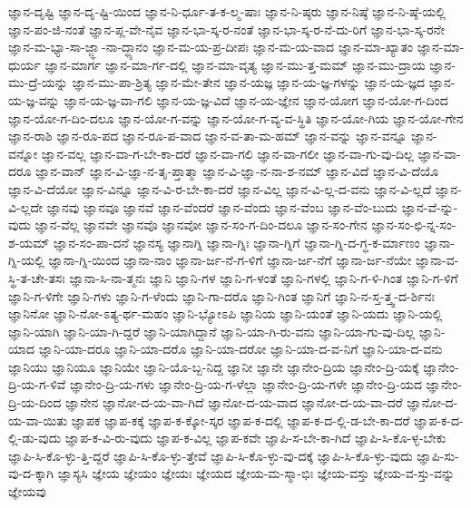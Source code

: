 {ಜ್ಞಾನ-ದೃಷ್ಟಿ
ಜ್ಞಾನ-ದೃ-ಷ್ಟಿ-ಯಿಂದ
ಜ್ಞಾನ-ನಿ-ರ್ಧೂ-ತ-ಕ-ಲ್ಮ-ಷಾಃ
ಜ್ಞಾನ-ನಿ-ಷ್ಠರು
ಜ್ಞಾನ-ನಿಷ್ಠೆ
ಜ್ಞಾನ-ನಿ-ಷ್ಠೆ-ಯಲ್ಲಿ
ಜ್ಞಾನ-ಪಂ-ಜಿ-ನಂತೆ
ಜ್ಞಾನ-ಪ್ಲ-ವೇ-ನೈವ
ಜ್ಞಾನ-ಭಾ-ಸ್ಕ-ರ-ನಂತೆ
ಜ್ಞಾನ-ಭಾ-ಸ್ಕ-ರ-ನೆ-ದು-ರಿಗೆ
ಜ್ಞಾನ-ಭಾ-ಸ್ಕ-ರನೇ
ಜ್ಞಾನ-ಮ-ಭ್ಯಾ-ಸಾ-ಜ್ಜ್ಞಾ-ನಾ-ದ್ಧ್ಯಾನಂ
ಜ್ಞಾನ-ಮ-ಯ-ಪ್ರ-ದೀಪಃ
ಜ್ಞಾನ-ಮ-ಯ-ವಾದ
ಜ್ಞಾನ-ಮಾ-ಖ್ಯಾತಂ
ಜ್ಞಾನ-ಮಾ-ಧುರ್ಯ
ಜ್ಞಾನ-ಮಾರ್ಗ
ಜ್ಞಾನ-ಮಾ-ರ್ಗ-ದಲ್ಲಿ
ಜ್ಞಾನ-ಮಾ-ವೃತ್ಯ
ಜ್ಞಾನ-ಮು-ತ್ತ-ಮಮ್
ಜ್ಞಾನ-ಮು-ದ್ರಾಯ
ಜ್ಞಾನ-ಮು-ದ್ರೆ-ಯನ್ನು
ಜ್ಞಾನ-ಮು-ಪಾ-ಶ್ರಿತ್ಯ
ಜ್ಞಾನ-ಮೇ-ತೇನ
ಜ್ಞಾನ-ಯಜ್ಞ
ಜ್ಞಾನ-ಯ-ಜ್ಞ-ಗಳನ್ನು
ಜ್ಞಾನ-ಯ-ಜ್ಞದ
ಜ್ಞಾನ-ಯ-ಜ್ಞ-ವನ್ನು
ಜ್ಞಾನ-ಯ-ಜ್ಞ-ವಾ-ಗಲಿ
ಜ್ಞಾನ-ಯ-ಜ್ಞ-ವಿದೆ
ಜ್ಞಾನ-ಯ-ಜ್ಞೇನ
ಜ್ಞಾನ-ಯೋಗ
ಜ್ಞಾನ-ಯೋ-ಗ-ದಿಂದ
ಜ್ಞಾನ-ಯೋ-ಗ-ದಿಂ-ದಲೂ
ಜ್ಞಾನ-ಯೋ-ಗ-ವನ್ನು
ಜ್ಞಾನ-ಯೋ-ಗ-ವ್ಯ-ವ-ಸ್ಥಿತಿ
ಜ್ಞಾನ-ಯೋ-ಗಿಯ
ಜ್ಞಾನ-ಯೋ-ಗೇನ
ಜ್ಞಾನ-ರಾಶಿ
ಜ್ಞಾನ-ರೂ-ಪದ
ಜ್ಞಾನ-ರೂ-ಪ-ವಾದ
ಜ್ಞಾನ-ವ-ತಾ-ಮ-ಹಮ್
ಜ್ಞಾನ-ವನ್ನು
ಜ್ಞಾನ-ವನ್ನೂ
ಜ್ಞಾನ-ವನ್ನೋ
ಜ್ಞಾನ-ವಲ್ಲ
ಜ್ಞಾನ-ವಾ-ಗ-ಬೇ-ಕಾ-ದರೆ
ಜ್ಞಾನ-ವಾ-ಗಲಿ
ಜ್ಞಾನ-ವಾ-ಗಲೀ
ಜ್ಞಾನ-ವಾ-ಗು-ವು-ದಿಲ್ಲ
ಜ್ಞಾನ-ವಾ-ದರೂ
ಜ್ಞಾನ-ವಾನ್
ಜ್ಞಾನ-ವಿ-ಜ್ಞಾ-ನ-ತೃ-ಪ್ತಾತ್ಮಾ
ಜ್ಞಾನ-ವಿ-ಜ್ಞಾ-ನ-ನಾ-ಶ-ನಮ್
ಜ್ಞಾನ-ವಿದೆ
ಜ್ಞಾನ-ವಿ-ದೆಯೊ
ಜ್ಞಾನ-ವಿ-ದೆಯೋ
ಜ್ಞಾನ-ವಿನ್ನೂ
ಜ್ಞಾನ-ವಿ-ರ-ಬೇ-ಕಾ-ದರೆ
ಜ್ಞಾನ-ವಿಲ್ಲ
ಜ್ಞಾನ-ವಿ-ಲ್ಲ-ದ-ವನು
ಜ್ಞಾನ-ವಿ-ಲ್ಲದೆ
ಜ್ಞಾನ-ವಿ-ಲ್ಲದೇ
ಜ್ಞಾನವು
ಜ್ಞಾನವೂ
ಜ್ಞಾನವೆ
ಜ್ಞಾನ-ವೆಂದರೆ
ಜ್ಞಾನ-ವೆಂದು
ಜ್ಞಾನ-ವೆಂಬ
ಜ್ಞಾನ-ವೆಂ-ಬುದು
ಜ್ಞಾನ-ವೆ-ನ್ನು-ವುದು
ಜ್ಞಾನ-ವೆಲ್ಲ
ಜ್ಞಾನವೇ
ಜ್ಞಾನವೊ
ಜ್ಞಾನವೋ
ಜ್ಞಾನ-ಸಂ-ಗ-ದಿಂ-ದಲೂ
ಜ್ಞಾನ-ಸಂ-ಗೇನ
ಜ್ಞಾನ-ಸಂ-ಛಿ-ನ್ನ-ಸಂ-ಶ-ಯಮ್
ಜ್ಞಾನ-ಸಂ-ಪಾ-ದನೆ
ಜ್ಞಾನಸ್ಯ
ಜ್ಞಾನಾಗ್ನಿ
ಜ್ಞಾನಾ-ಗ್ನಿಃ
ಜ್ಞಾನಾ-ಗ್ನಿಗೆ
ಜ್ಞಾನಾ-ಗ್ನಿ-ದ-ಗ್ಧ-ಕ-ರ್ಮಾಣಂ
ಜ್ಞಾನಾ-ಗ್ನಿ-ಯಲ್ಲಿ
ಜ್ಞಾನಾ-ಗ್ನಿ-ಯಿಂದ
ಜ್ಞಾನಾ-ನಾಂ
ಜ್ಞಾನಾ-ರ್ಜ-ನೆ-ಗ-ಳಿಗೆ
ಜ್ಞಾನಾ-ರ್ಜ-ನೆಗೆ
ಜ್ಞಾನಾ-ರ್ಜ-ನೆಯೇ
ಜ್ಞಾನಾ-ವ-ಸ್ಥಿ-ತ-ಚೇ-ತಸಃ
ಜ್ಞಾನಾ-ಸಿ-ನಾ-ತ್ಮನಃ
ಜ್ಞಾನಿ
ಜ್ಞಾನಿ-ಗಳ
ಜ್ಞಾನಿ-ಗ-ಳಂತೆ
ಜ್ಞಾನಿ-ಗಳಲ್ಲಿ
ಜ್ಞಾನಿ-ಗ-ಳಿ-ಗಿಂತ
ಜ್ಞಾನಿ-ಗ-ಳಿಗೆ
ಜ್ಞಾನಿ-ಗ-ಳಿಗೇ
ಜ್ಞಾನಿ-ಗಳು
ಜ್ಞಾನಿ-ಗ-ಳೆಂದು
ಜ್ಞಾನಿ-ಗಾ-ದರೊ
ಜ್ಞಾನಿ-ಗಿಂತ
ಜ್ಞಾನಿಗೆ
ಜ್ಞಾನಿ-ನ-ಸ್ತ-ತ್ತ್ವ-ದ-ರ್ಶಿನಃ
ಜ್ಞಾನಿನೋ
ಜ್ಞಾನಿ-ನೋ-ಽತ್ಯ-ರ್ಥ-ಮಹಂ
ಜ್ಞಾನಿ-ಭ್ಯೋಽಪಿ
ಜ್ಞಾನಿಯ
ಜ್ಞಾನಿ-ಯಂತೆ
ಜ್ಞಾನಿ-ಯದು
ಜ್ಞಾನಿ-ಯಲ್ಲಿ
ಜ್ಞಾನಿ-ಯಾಗಿ
ಜ್ಞಾನಿ-ಯಾ-ಗಿ-ದ್ದರೆ
ಜ್ಞಾನಿ-ಯಾಗಿದ್ದಾನೆ
ಜ್ಞಾನಿ-ಯಾ-ಗಿ-ರು-ವನು
ಜ್ಞಾನಿ-ಯಾ-ಗು-ವು-ದಿಲ್ಲ
ಜ್ಞಾನಿ-ಯಾದ
ಜ್ಞಾನಿ-ಯಾ-ದರೂ
ಜ್ಞಾನಿ-ಯಾ-ದರೊ
ಜ್ಞಾನಿ-ಯಾ-ದರೋ
ಜ್ಞಾನಿ-ಯಾ-ದ-ವ-ನಿಗೆ
ಜ್ಞಾನಿ-ಯಾ-ದ-ವನು
ಜ್ಞಾನಿಯು
ಜ್ಞಾನಿಯೂ
ಜ್ಞಾನಿಯೇ
ಜ್ಞಾನಿ-ಯೊ-ಬ್ಬ-ನಿದ್ದ
ಜ್ಞಾನೀ
ಜ್ಞಾನೇ
ಜ್ಞಾನೇಂ-ದ್ರಿಯ
ಜ್ಞಾನೇಂ-ದ್ರಿ-ಯಕ್ಕೆ
ಜ್ಞಾನೇಂ-ದ್ರಿ-ಯ-ಗ-ಳಿವೆ
ಜ್ಞಾನೇಂ-ದ್ರಿ-ಯ-ಗಳು
ಜ್ಞಾನೇಂ-ದ್ರಿ-ಯ-ಗ-ಳೆಲ್ಲಾ
ಜ್ಞಾನೇಂ-ದ್ರಿ-ಯ-ಗಳೇ
ಜ್ಞಾನೇಂ-ದ್ರಿ-ಯದ
ಜ್ಞಾನೇಂ-ದ್ರಿ-ಯ-ದಿಂದ
ಜ್ಞಾನೇನ
ಜ್ಞಾನೋ-ದ-ಯ-ವಾ-ಗಿದೆ
ಜ್ಞಾನೋ-ದ-ಯ-ವಾದ
ಜ್ಞಾನೋ-ದ-ಯ-ವಾ-ದರೆ
ಜ್ಞಾನೋ-ದ-ಯ-ವಾ-ಯಿತು
ಜ್ಞಾಪಕ
ಜ್ಞಾಪ-ಕಕ್ಕೆ
ಜ್ಞಾಪ-ಕ-ಕ್ಕೋ-ಸ್ಕರ
ಜ್ಞಾಪ-ಕ-ದಲ್ಲಿ
ಜ್ಞಾಪ-ಕ-ದ-ಲ್ಲಿ-ಡ-ಬೇ-ಕಾ-ದರೆ
ಜ್ಞಾಪ-ಕ-ದ-ಲ್ಲಿ-ಡು-ವುದು
ಜ್ಞಾಪ-ಕ-ವಿ-ರು-ವುದು
ಜ್ಞಾಪ-ಕ-ವಿಲ್ಲ
ಜ್ಞಾಪ-ಕವೇ
ಜ್ಞಾಪಿ-ಸ-ಬೇ-ಕಾ-ಗಿದೆ
ಜ್ಞಾಪಿ-ಸಿ-ಕೊ-ಳ್ಳ-ಬೇಕು
ಜ್ಞಾಪಿ-ಸಿ-ಕೊ-ಳ್ಳು-ತ್ತಿ-ದ್ದರೆ
ಜ್ಞಾಪಿ-ಸಿ-ಕೊ-ಳ್ಳು-ತ್ತೇವೆ
ಜ್ಞಾಪಿ-ಸಿ-ಕೊ-ಳ್ಳು-ವು-ದಕ್ಕೆ
ಜ್ಞಾಪಿ-ಸಿ-ಕೊ-ಳ್ಳು-ವುದು
ಜ್ಞಾಪಿ-ಸು-ವು-ದ-ಕ್ಕಾಗಿ
ಜ್ಞಾಸ್ಯಸಿ
ಜ್ಞೇಯ
ಜ್ಞೇಯಂ
ಜ್ಞೇಯಃ
ಜ್ಞೇಯದ
ಜ್ಞೇಯ-ಮ-ಸ್ಮಾ-ಭಿಃ
ಜ್ಞೇಯ-ವಸ್ತು
ಜ್ಞೇಯ-ವ-ಸ್ತು-ವನ್ನು
ಜ್ಞೇಯವು
}
